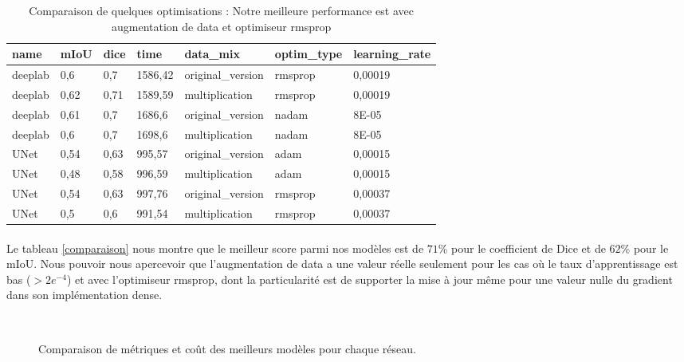 \documentclass[
10pt, %
a4paper, %
oneside, %
headinclude,footinclude, %
]{scrartcl}
\begin{document}
\begin{table}[h]\center
\begin{tabular}{@{}lllllll@{}}
\toprule
name    & mIoU & dice & time    & data\_mix         & optim\_type & learning\_rate \\ \midrule
deeplab & 0,6  & 0,7  & 1586,42 & original\_version & rmsprop     & 0,00019        \\
deeplab & 0,62 & 0,71 & 1589,59 & multiplication    & rmsprop     & 0,00019        \\
deeplab & 0,61 & 0,7  & 1686,6  & original\_version & nadam       & 8E-05          \\
deeplab & 0,6  & 0,7  & 1698,6  & multiplication    & nadam       & 8E-05          \\
UNet    & 0,54 & 0,63 & 995,57  & original\_version & adam        & 0,00015        \\
UNet    & 0,48 & 0,58 & 996,59  & multiplication    & adam        & 0,00015        \\
UNet    & 0,54 & 0,63 & 997,76  & original\_version & rmsprop     & 0,00037        \\
UNet    & 0,5  & 0,6  & 991,54  & multiplication    & rmsprop     & 0,00037        \\ \bottomrule
\end{tabular}
\caption[Comparaison de quelques optimisations]{Comparaison de quelques optimisations : Notre meilleure performance est avec augmentation de data et optimiseur rmsprop}
\label{comparaison_table}
\end{table}

\paragraph{}Le tableau \ref{comparaison} nous montre que le meilleur score parmi nos modèles est de $71$\% pour le  coefficient de Dice et de $62$\% pour le mIoU. Nous pouvoir nous apercevoir que l’augmentation de data a une valeur réelle seulement pour les cas où le taux d’apprentissage est bas ($>2e^{-4}$) et avec l’optimiseur rmsprop, dont la particularité est de supporter la mise à jour même pour une valeur nulle du gradient dans son implémentation dense.

\begin{figure}[htb]
\centering
{} \quad
{} \\
 \quad
{}
\caption[Mesure des performances]{Comparaison de métriques et coût des meilleurs modèles pour chaque réseau.} %
\label{fig:comparaison}
\end{figure}
\end{document}
